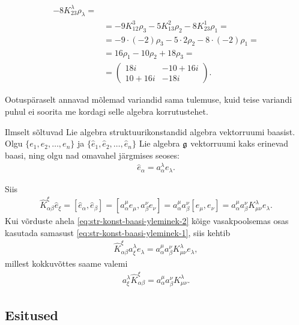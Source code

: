\begin{naide}
\begin{align*}
           -8 K_{23}^{\lambda} \rho_\lambda = \\
        &= -9 K_{12}^{3} \rho_3
           -5 K_{13}^{2} \rho_2
           -8 K_{23}^{1} \rho_1 = \\
        &= -9 \cdot (-2) \rho_3
           -5 \cdot 2 \rho_2
           -8 \cdot (-2) \rho_1 = \\
        &= 16 \rho_1 - 10 \rho_2 + 18 \rho_3 = \\[0.1cm]
        &= \begin{pmatrix}
               18i & -10+16i \\
            10+16i &    -18i
        \end{pmatrix}.
    \end{align*}

    Ootuspäraselt annavad mõlemad variandid sama tulemuse, kuid teise
    variandi puhul ei soorita me kordagi selle algebra korrutustehet.
\end{naide}

Ilmselt sõltuvad Lie algebra struktuurikonstandid algebra vektorruumi
baasist. Olgu $\{ e_1, e_2, \dots, e_n \}$ ja
$\{ \hat{e}_1, \hat{e}_2, \dots, \hat{e}_n \}$ Lie algebra $\mathfrak{g}$
vektorruumi kaks erinevad baasi, ning olgu nad omavahel järgmises
seoses:
\begin{align}\label{eq:str-konst-baasi-yleminek-1}
    \hat{e}_\alpha = a_\alpha^\lambda e_\lambda.
\end{align}

Siis
\begin{align}\label{eq:str-konst-baasi-yleminek-2}
    \hat{K}_{\alpha \beta}^{\xi} \hat{e}_\xi = 
    [\hat{e}_\alpha, \hat{e}_\beta] =
    [a_\alpha^\mu e_\mu, a_\beta^\nu e_\nu] =
    a_\alpha^\mu a_\beta^\nu [e_\mu, e_\nu] =
    a_\alpha^\mu a_\beta^\nu K_{\mu \nu}^{\lambda} e_\lambda.
\end{align}
Kui võrduste ahela \eqref{eq:str-konst-baasi-yleminek-2} kõige
vasakpoolsemas osas kasutada samasust
\eqref{eq:str-konst-baasi-yleminek-1}, siis kehtib
\begin{align*}
    \hat{K}_{\alpha \beta}^{\xi} a_\xi^\lambda e_\lambda =
    a_\alpha^\mu a_\beta^\nu K_{\mu \nu}^{\lambda} e_\lambda,
\end{align*}
millest kokkuvõttes saame valemi
\begin{align*}
    a_\xi^\lambda \hat{K}_{\alpha \beta}^{\xi} =
    a_\alpha^\mu a_\beta^\nu K_{\mu \nu}^{\lambda}.
\end{align*}

\subsection{Esitused}

